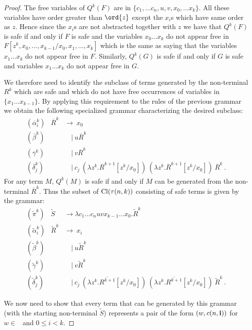 \begin{proof}
The free variables of $Q^k(F)$ are in $\{ c_1, \ldots c_n, u, v, x_0,\ldots x_{k}\}$.
All these variables have order greater than $\ord{z}$ except the $x_i$s which have same order as $z$. Hence since the $x_i$s are not abstracted together with $z$ we have that $Q^k(F)$ is safe if and only if
$F$ is safe and the variables $x_0\ldots x_k$ do not appear free in $F[z^k,x_0,\ldots, x_{k-1}/x_0,x_1, \ldots, x_k]$ which is the same as saying that the variables $x_1\ldots x_k$ do not appear free in $F$.
Similarly, $Q^k(G)$ is safe if and only if $G$ is safe and 
variables $x_1\ldots x_k$ do not appear free in $G$.

We therefore need to identify the subclass of terms generated by the non-terminal $R^k$ which are safe and which do not have free occurrences of variables in $\{x_1 \ldots x_{k-1}\}$. By applying this requirement to the rules of the previous grammar we obtain the following specialized grammar characterizing the desired subclass:
\begin{eqnarray*}
  (\overline\alpha_i^k) &\overline R^k &\rightarrow\ x_0 \\
  (\overline\beta^k) && \quad|\  u \overline R^k \\
  (\overline\gamma^k) && \quad|\  v \overline R^k  \\
  (\overline\delta^k_j) && \quad|\  c_j\ (\lambda z^k. \overline R^{k+1}[z^k/x_0]) \ (\lambda z^k. \overline R^{k+1} [z^k/x_0]) \ \overline R^k \ .
\end{eqnarray*}
For any term $M$, $Q^k(M)$ is safe if and only if $M$ can be generated from the non-terminal $\overline R^k$. Thus the subset of ${\rm Cl}(\tau(n,k))$ consisting of safe terms is given by the grammar:
\begin{eqnarray*}
  (\widetilde\pi^k) &\widetilde S &\rightarrow \lambda c_1 \ldots c_n u v x_{k-1} \ldots x_0 . \widetilde R^k \\
  (\widetilde\alpha_i^k) &\widetilde R^k &\rightarrow\ x_i \\
  (\widetilde\beta^k) && \quad|\  u \widetilde R^k \\
  (\widetilde\gamma^k) && \quad|\  v \widetilde R^k \\
  (\widetilde\delta^k_j) && \quad|\  c_j\ (\lambda z^k. \overline{R^{k+1}}[z^k/x_0]) \ (\lambda z^k. \overline{R^{k+1}}[z^k/x_0]) \ \widetilde R^k \ .
\end{eqnarray*}

We now need to show that every term that can be generated by this grammar (\ie with the starting non-terminal $\widetilde S$) represents a pair of the form $(w,c(n,\mathbf{i}))$ for $w\in$ \safedefset\ and $0 \leq i<k$.


\end{proof}
